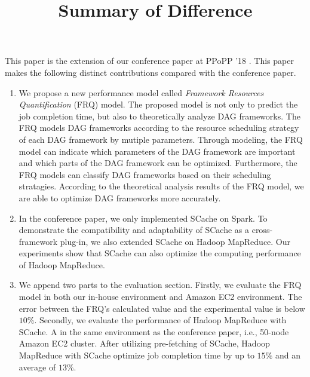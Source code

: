 \documentclass [14pt,journal,compsoc]{article}
\begin{document}
\title{Summary of Difference}
\maketitle

This paper is the extension of our conference paper at PPoPP '18 \cite{fu2018efficient}. 
This paper makes the following distinct contributions compared with the conference paper.

\begin{enumerate}
\item 
We propose a new performance model called \textit{Framework Resources Quantification} (FRQ) model.
The proposed model is not only to predict the job completion time, but also to theoretically analyze DAG frameworks.
The FRQ models DAG frameworks according to the resource scheduling strategy of each DAG framework by mutiple parameters.
Through modeling, the FRQ model can indicate which parameters of the DAG framework are important and which parts of the DAG framework can be optimized. 
Furthermore, the FRQ models can classify DAG frameworks based on their scheduling stratagies.
According to the theoretical analysis results of the FRQ model, we are able to optimize DAG frameworks more accurately.
\item 
In the conference paper, we only implemented SCache on Spark. To demonstrate the compatibility and adaptability of SCache as a cross-framework plug-in, we also extended SCache on Hadoop MapReduce. 
Our experiments show that SCache can also optimize the computing performance of Hadoop MapReduce.
\item
We append two parts to the evaluation section. Firstly, we evaluate the FRQ model in both our in-house environment and Amazon EC2 environment. The error between the FRQ’s calculated value and the experimental value is below $10\%$. Secondly, we evaluate the performance of Hadoop MapReduce with SCache. A in the same environment as the conference paper, i.e., 50-node Amazon EC2 cluster.
After utilizing pre-fetching of SCache, Hadoop MapReduce with SCache optimize job completion time by up to $15\%$ and an average of $13\%$.
\end{enumerate}
\end{document}
